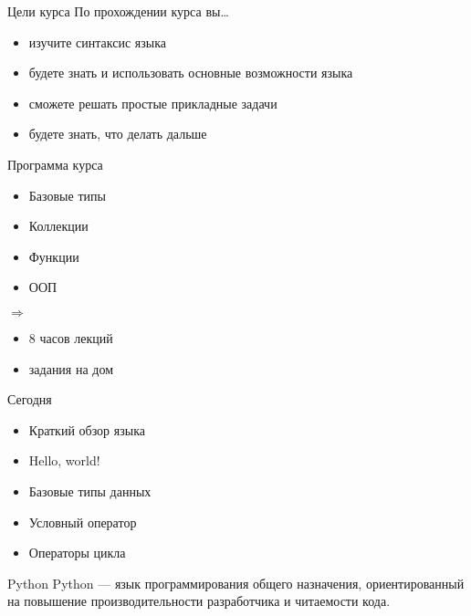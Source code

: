 \documentclass[hyperref={pdftex,unicode}]{beamer}
\begin{document}
\begin{frame}{Цели курса}
  По прохождении курса вы\dots
  \begin{itemize}
    \item изучите синтаксис языка
    \item будете знать и использовать основные возможности языка
    \item сможете решать простые прикладные задачи
    \item будете знать, что делать дальше
  \end{itemize}
\end{frame}

\begin{frame}{Программа курса}
  \begin{minipage}{0.4\linewidth}
    \begin{itemize}
    \item Базовые типы
    \item Коллекции
    \item Функции
    \item ООП
    \end{itemize}
  \end{minipage}
  $ \Longrightarrow $
  \hfill
  \begin{minipage}{0.4\linewidth}
    \begin{itemize}
    \item 8 часов лекций
    \item задания на дом
   \end{itemize}
  \end{minipage}
\end{frame}

\begin{frame}{Сегодня}
  \begin{itemize}
  \item Краткий обзор языка
  \item Hello, world!
  \item Базовые типы данных
  \item Условный оператор
  \item Операторы цикла
  \end{itemize}
\end{frame}

\begin{frame}{Python}
  Python --- язык программирования общего назначения,
  ориентированный на повышение производительности разработчика и читаемости кода.
\end{frame}
\end{document}
